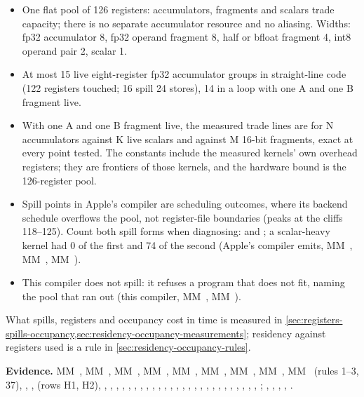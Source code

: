 \begin{itemize}
\item One flat pool of 126 registers: accumulators, fragments and scalars trade capacity; there is no separate accumulator
  resource and no aliasing. Widths: fp32 accumulator 8, fp32 operand fragment 8, half or bfloat fragment 4, int8 operand
  pair 2, scalar 1.
\item At most 15 live eight-register fp32 accumulator groups in straight-line code (122 registers touched; 16 spill 24
  stores), 14 in a loop with one A and one B fragment live.
\item With one A and one B fragment live, the measured trade lines are  for N accumulators against K live
  scalars and  against M 16-bit fragments, exact at every point tested. The constants include the
  measured kernels' own overhead registers; they are frontiers of those kernels, and the hardware bound is the 126-register
  pool.
\item Spill points in Apple's compiler are scheduling outcomes, where its backend schedule overflows the pool, not
  register-file boundaries (peaks at the cliffs 118–125). Count both spill forms when diagnosing:  and ; a scalar-heavy kernel had 0 of the first and
  74 of the second (Apple's compiler emits, MM~, MM~, MM~).
\item This compiler does not spill: it refuses a program that does not fit, naming the pool that ran out (this compiler,
  MM~, MM~).
\end{itemize}

What spills, registers and occupancy cost in time is measured in \cref{sec:registers-spills-occupancy,sec:residency-occupancy-measurements}; residency against registers
used is a rule in \cref{sec:residency-occupancy-rules}.

\textbf{Evidence.} MM~, MM~, MM~, MM~, MM~, MM~, MM~, MM~, MM~ (rules 1–3, 37), , ,
 (rows H1, H2), , , , , , , , , ,
, , , , , , , , ,
, , , , , , , , ; ,
, , , .
